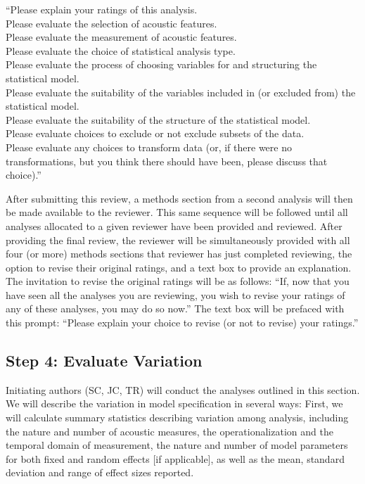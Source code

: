 \documentclass[
  english,
  man]{apa6}
\begin{document}
\noindent \enquote{Please explain your ratings of this analysis.\\
\noindent Please evaluate the selection of acoustic features.\\
\noindent Please evaluate the measurement of acoustic features.\\
\noindent Please evaluate the choice of statistical analysis type.\\
\noindent Please evaluate the process of choosing variables for and structuring the statistical model.\\
\noindent Please evaluate the suitability of the variables included in (or excluded from) the statistical model.\\
\noindent Please evaluate the suitability of the structure of the statistical model.\\
\noindent Please evaluate choices to exclude or not exclude subsets of the data.\\
\noindent Please evaluate any choices to transform data (or, if there were no transformations, but you think there should have been, please discuss that choice).}

After submitting this review, a methods section from a second analysis will then be made available to the reviewer.
This same sequence will be followed until all analyses allocated to a given reviewer have been provided and reviewed.
After providing the final review, the reviewer will be simultaneously provided with all four (or more) methods sections that reviewer has just completed reviewing, the option to revise their original ratings, and a text box to provide an explanation.
The invitation to revise the original ratings will be as follows: \enquote{If, now that you have seen all the analyses you are reviewing, you wish to revise your ratings of any of these analyses, you may do so now.}
The text box will be prefaced with this prompt: \enquote{Please explain your choice to revise (or not to revise) your ratings.}

\hypertarget{step-4-evaluate-variation}{%
\subsection{Step 4: Evaluate Variation}\label{step-4-evaluate-variation}}

Initiating authors (SC, JC, TR) will conduct the analyses outlined in this section.
We will describe the variation in model specification in several ways:
First, we will calculate summary statistics describing variation among analysis, including the nature and number of acoustic measures, the operationalization and the temporal domain of measurement, the nature and number of model parameters for both fixed and random effects {[}if applicable{]}, as well as the mean, standard deviation and range of effect sizes reported.
\end{document}
